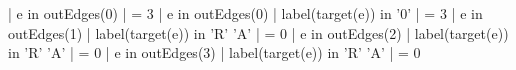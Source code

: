 |{ e in outEdges(0) }| = 3
|{ e in outEdges(0) | label(target(e)) in { '0' } }| = 3
|{ e in outEdges(1) | label(target(e)) in { 'R' 'A' } }| = 0
|{ e in outEdges(2) | label(target(e)) in { 'R' 'A' } }| = 0
|{ e in outEdges(3) | label(target(e)) in { 'R' 'A' } }| = 0
